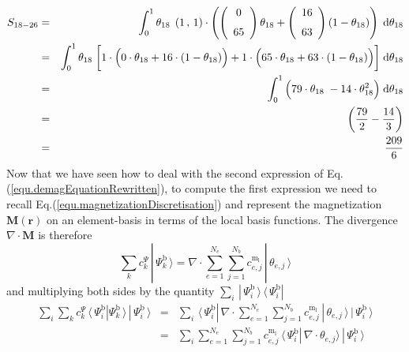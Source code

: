 \documentclass[11pt]{article}
\renewcommand{\d}{\mathrm{d}} %
\newcommand{\rv}[1]{\ensuremath{\mathbf{#1}}} %
\newcommand{\vc}[1]{\,|\,#1 \, \rangle}
\newcommand{\ivc}[1]{\,\langle\,#1|}
\begin{document}
\begin{eqnarray}
  S_{18-26}
  &=&
  \int_{0}^{1} 
  \theta_{18} \;
  \left( 1\,,\, 1 \right) 
  \cdot 
  \left(
    \left(
      \begin {array}{c}
        0\\
        \noalign{\medskip}
        65
      \end {array}
    \right)
    \theta_{18}
    +
    \left(
      \begin {array}{c}
        16\\
        \noalign{\medskip}
        63
      \end {array}
    \right)
    ( 1- \theta_{18})
  \right) 
  \;  \d \theta_{18}
  \nonumber \\ & = &
  \int_{0}^{1} 
  \theta_{18} \;
  \bigg[
  1 \cdot \Big(
  0\cdot\theta_{18} + 16\cdot(1 - \theta_{18})
  \Big)
  +
  1 \cdot \Big(
  65\cdot\theta_{18} + 63\cdot(1 - \theta_{18})
  \Big)
  \bigg]
  \;  \d \theta_{18}
  \nonumber \\
  &=&
  \int_{0}^{1} 
  \Big(
  79 \cdot \theta_{18} \;
  -
  14 \cdot \theta_{18}^2
  \Big)
  \;  \d \theta_{18}
  \nonumber \\
  &=&
    \left( \frac{79}{2} 
  -
  \frac{14}{3} 
  \right)
  \nonumber \\ 
  &=&
  \frac{209}{6}
\end{eqnarray}
Now that we have seen how to deal with the second expression of
Eq.(\ref{equ.demagEquationRewritten}), to compute the first expression
we need to recall Eq.(\ref{equ.magnetizationDiscretisation}) and
represent the magnetization $\rv{M(r)}$ on an element-basis in terms
of the local basis functions. The divergence $\nabla \cdot
\rv{M}$ is therefore  
\begin{equation}
\sum_k c^\Psi_k \vc{\Psi^\mathrm{b}_{k}}  = \nabla \cdot \sum_{e=1}^{N_e} \sum_{j=1}^{N_b} c^\mathrm{m_l}_{e,j}
\vc{\theta_{e,j}}  
\label{equ.divergenceMagnetization}
\end{equation}
and multiplying both sides by the quantity $\sum_i
\vc{\Psi^\mathrm{b}_{i}}\ivc{\Psi^\mathrm{b}_{i}}$ 
\begin{eqnarray}
  \sum_i \sum_k 
  c^\Psi_k \ivc{\Psi^\mathrm{b}_{i}} \Psi^\mathrm{b}_{k}
  \,\rangle \vc{\Psi^\mathrm{b}_{i}} 
& = &
\sum_i
\ivc{\Psi^\mathrm{b}_{i}} \,
\nabla \cdot 
\sum_{e=1}^{N_e} 
\sum_{j=1}^{N_b} 
c^\mathrm{m_l}_{e,j}
\vc{\theta_{e,j}}
\vc{\Psi^\mathrm{b}_{i}}
\\
& = &
\sum_i \sum_{e=1}^{N_e} 
\sum_{j=1}^{N_b} 
c^\mathrm{m_l}_{e,j}
 \ivc{\Psi^\mathrm{b}_{i}} \,
\nabla \cdot \theta_{e,j} \rangle
\vc{\Psi^\mathrm{b}_{i}}
\label{equ.relationBeetweenCoefficientsDivergence}
\end{eqnarray}
\end{document}
